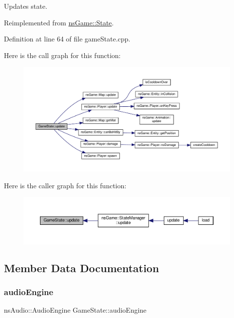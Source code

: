 Updates state. 



Reimplemented from \hyperlink{classns_game_1_1_state_ae809e89ac9df4a43ab90d5d5932e2bc7}{ns\+Game\+::\+State}.



Definition at line 64 of file game\+State.\+cpp.

Here is the call graph for this function\+:\nopagebreak
\begin{figure}[H]
\begin{center}
\leavevmode
\includegraphics[width=350pt]{class_game_state_a1d57727f6910092368b4a1a5a598b0d0_cgraph}
\end{center}
\end{figure}
Here is the caller graph for this function\+:\nopagebreak
\begin{figure}[H]
\begin{center}
\leavevmode
\includegraphics[width=350pt]{class_game_state_a1d57727f6910092368b4a1a5a598b0d0_icgraph}
\end{center}
\end{figure}


\subsection{Member Data Documentation}
\mbox{\label{class_game_state_add088b04887aa7b73683ff610c70e311}} 
\subsubsection{\texorpdfstring{audio\+Engine}{audioEngine}}
{\footnotesize\ttfamily ns\+Audio\+::\+Audio\+Engine Game\+State\+::audio\+Engine}



